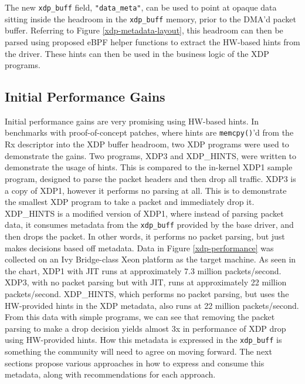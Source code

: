 \documentclass[letterpaper]{article}
\begin{document}
The new {\small \texttt{xdp\_buff}} field, {\small \texttt{"data\_meta"}}, can be used to point at opaque data sitting inside the headroom in the {\small \texttt{xdp\_buff}} memory, prior to the DMA'd packet buffer. Referring to Figure \ref{xdp-metadata-layout}, this headroom can then be parsed using proposed eBPF helper functions to extract the HW-based hints from the driver. These hints can then be used in the business logic of the XDP programs.

\subsection{Initial Performance Gains}

Initial performance gains are very promising using HW-based hints. In benchmarks with proof-of-concept patches, where hints are {\small \texttt{memcpy()}}'d from the Rx descriptor into the XDP buffer headroom, two XDP programs were used to demonstrate the gains.
\newline
\indent Two programs, XDP3 and XDP\_HINTS, were written to demonstrate the usage of hints. This is compared to the in-kernel XDP1 sample program, designed to parse the packet headers and then drop all traffic.  XDP3 is a copy of XDP1, however it performs no parsing at all. This is to demonstrate the smallest XDP program to take a packet and immediately drop it.  XDP\_HINTS is a modified version of XDP1, where instead of parsing packet data, it consumes metadata from the {\small \texttt{xdp\_buff}} provided by the base driver, and then drops the packet. In other words, it performs no packet parsing, but just makes decisions based off metadata.
\newline
\indent Data in Figure \ref {xdp-performance} was collected on an Ivy Bridge-class Xeon platform as the target machine. As seen in the chart, XDP1 with JIT runs at approximately 7.3 million packets/second. XDP3, with no packet parsing but with JIT, runs at approximately 22 million packets/second. XDP\_HINTS, which performs no packet parsing, but uses the HW-provided hints in the XDP metadata, also runs at 22 million packets/second. From this data with simple programs, we can see that removing the packet parsing to make a drop decision yields almost 3x in performance of XDP drop using HW-provided hints.
\newline
\indent How this metadata is expressed in the {\small \texttt{xdp\_buff}} is something the community will need to agree on moving forward. The next sections propose various approaches in how to express and consume this metadata, along with recommendations for each approach.
\end{document}
